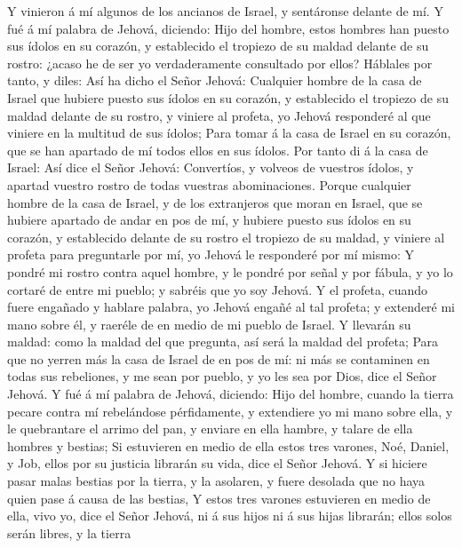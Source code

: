  Y vinieron á mí algunos de los ancianos de Israel, y
sentáronse delante de mí.  Y fué á mí palabra de Jehová,
diciendo:  Hijo del hombre, estos hombres han puesto sus
ídolos en su corazón, y establecido el tropiezo de su maldad delante de
su rostro: ¿acaso he de ser yo verdaderamente consultado por ellos?
 Háblales por tanto, y diles: Así ha dicho el Señor
Jehová: Cualquier hombre de la casa de Israel que hubiere puesto sus
ídolos en su corazón, y establecido el tropiezo de su maldad delante de
su rostro, y viniere al profeta, yo Jehová responderé al que viniere en
la multitud de sus ídolos;  Para tomar á la casa de Israel
en su corazón, que se han apartado de mí todos ellos en sus ídolos.
 Por tanto di á la casa de Israel: Así dice el Señor
Jehová: Convertíos, y volveos de vuestros ídolos, y apartad vuestro
rostro de todas vuestras abominaciones.  Porque cualquier
hombre de la casa de Israel, y de los extranjeros que moran en Israel,
que se hubiere apartado de andar en pos de mí, y hubiere puesto sus
ídolos en su corazón, y establecido delante de su rostro el tropiezo de
su maldad, y viniere al profeta para preguntarle por mí, yo Jehová le
responderé por mí mismo:  Y pondré mi rostro contra aquel
hombre, y le pondré por señal y por fábula, y yo lo cortaré de entre mi
pueblo; y sabréis que yo soy Jehová.  Y el profeta, cuando
fuere engañado y hablare palabra, yo Jehová engañé al tal profeta; y
extenderé mi mano sobre él, y raeréle de en medio de mi pueblo de
Israel.  Y llevarán su maldad: como la maldad del que
pregunta, así será la maldad del profeta;  Para que no
yerren más la casa de Israel de en pos de mí: ni más se contaminen en
todas sus rebeliones, y me sean por pueblo, y yo les sea por Dios, dice
el Señor Jehová.  Y fué á mí palabra de Jehová, diciendo:
 Hijo del hombre, cuando la tierra pecare contra mí
rebelándose pérfidamente, y extendiere yo mi mano sobre ella, y le
quebrantare el arrimo del pan, y enviare en ella hambre, y talare de
ella hombres y bestias;  Si estuvieren en medio de ella
estos tres varones, Noé, Daniel, y Job, ellos por su justicia librarán
su vida, dice el Señor Jehová.  Y si hiciere pasar malas
bestias por la tierra, y la asolaren, y fuere desolada que no haya quien
pase á causa de las bestias,  Y estos tres varones
estuvieren en medio de ella, vivo yo, dice el Señor Jehová, ni á sus
hijos ni á sus hijas librarán; ellos solos serán libres, y la tierra
